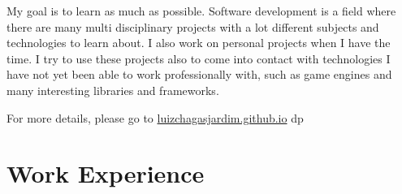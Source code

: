 \documentclass[a4paper,10pt]{article}
\newcommand{\cvtype}{d}
\begin{document}
{\quad}My goal is to learn as much as possible. Software development is a field where there are many multi disciplinary projects with a lot different subjects and technologies to learn about. I also work on personal projects when I have the time. I try to use these projects also to come into contact with technologies I have not yet been able to work professionally with, such as game engines and many interesting libraries and frameworks.

{\quad}\footnotesize{For more details, please go to \href{http://luizchagasjardim.github.io}{luizchagasjardim.github.io}}
\else
	\if \cvtype p

	\fi
\fi

\section{Work Experience}
\end{document}
